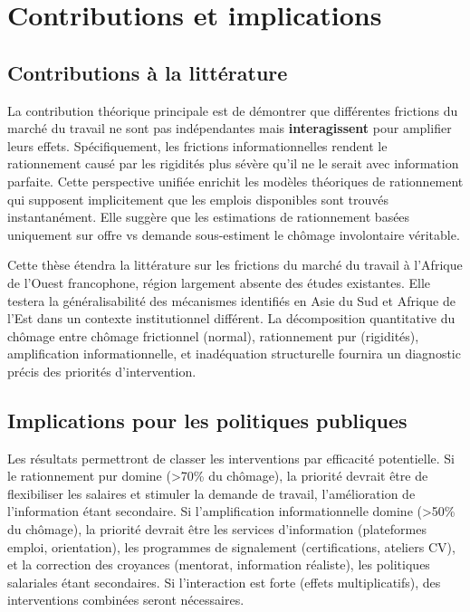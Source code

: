 \documentclass[12pt,a4paper]{article}
\begin{document}
\section{Contributions et implications}

\subsection{Contributions à la littérature}

La contribution théorique principale est de démontrer que différentes frictions du marché du travail ne sont pas indépendantes mais \textbf{interagissent} pour amplifier leurs effets. Spécifiquement, les frictions informationnelles rendent le rationnement causé par les rigidités plus sévère qu'il ne le serait avec information parfaite. Cette perspective unifiée enrichit les modèles théoriques de rationnement \citep{kaur2019, breza2021} qui supposent implicitement que les emplois disponibles sont trouvés instantanément. Elle suggère que les estimations de rationnement basées uniquement sur offre vs demande sous-estiment le chômage involontaire véritable.

Cette thèse étendra la littérature sur les frictions du marché du travail à l'Afrique de l'Ouest francophone, région largement absente des études existantes. Elle testera la généralisabilité des mécanismes identifiés en Asie du Sud et Afrique de l'Est dans un contexte institutionnel différent. La décomposition quantitative du chômage entre chômage frictionnel (normal), rationnement pur (rigidités), amplification informationnelle, et inadéquation structurelle fournira un diagnostic précis des priorités d'intervention.

\subsection{Implications pour les politiques publiques}

Les résultats permettront de classer les interventions par efficacité potentielle. Si le rationnement pur domine (>70\% du chômage), la priorité devrait être de flexibiliser les salaires et stimuler la demande de travail, l'amélioration de l'information étant secondaire. Si l'amplification informationnelle domine (>50\% du chômage), la priorité devrait être les services d'information (plateformes emploi, orientation), les programmes de signalement (certifications, ateliers CV), et la correction des croyances (mentorat, information réaliste), les politiques salariales étant secondaires. Si l'interaction est forte (effets multiplicatifs), des interventions combinées seront nécessaires.
\end{document}
